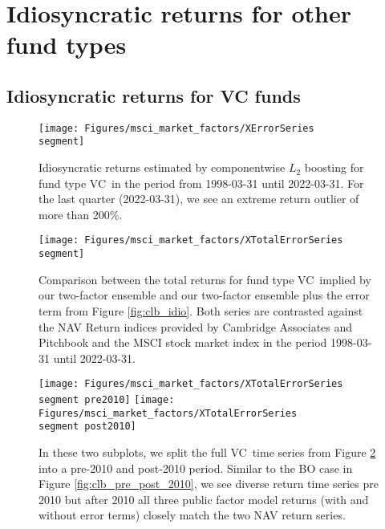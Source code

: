 \clearpage


\newcommand{\segment}{XXX}


\section{Idiosyncratic returns for other fund types}
\label{sec:error_terms_other_fund_types}

\subsection{Idiosyncratic returns for VC funds}
\label{sec:vc_errors}


\renewcommand{\segment}{VC}

\begin{figure}[H]
	\centering
	\texttt{[image: Figures/msci\_market\_factors/XErrorSeries\\segment]}
	\caption{
		Idiosyncratic returns estimated by componentwise $L_2$ boosting for fund type \segment \ in the period from 1998-03-31 until 2022-03-31.
		For the last quarter (2022-03-31), we see an extreme return outlier of more than 200\%.
	}
	\label{fig:clb_idio_\segment}
\end{figure}

\begin{figure}[H]
	\centering
	\texttt{[image: Figures/msci\_market\_factors/XTotalErrorSeries\\segment]}
	\caption{
		Comparison between the total returns for fund type \segment \ implied by our two-factor ensemble and our two-factor ensemble plus the error term from Figure \ref{fig:clb_idio}.
		Both series are contrasted against the NAV Return indices provided by Cambridge Associates and Pitchbook and the MSCI stock market index in the period 1998-03-31 until 2022-03-31.
	}
	\label{fig:clb_total_\segment}
\end{figure}

\begin{figure}[H]
	\centering
	\texttt{[image: Figures/msci\_market\_factors/XTotalErrorSeries\\segment pre2010]}
	\texttt{[image: Figures/msci\_market\_factors/XTotalErrorSeries\\segment post2010]}
	\caption{
		In these two subplots, we split the full \segment \ time series from Figure \ref{fig:clb_total_\segment} into a pre-2010 and post-2010 period.
		Similar to the BO case in Figure \ref{fig:clb_pre_post_2010}, we see diverse return time series pre 2010 but after 2010 all three public factor model returns (with and without error terms) closely match the two NAV return series.
	}
	\label{fig:clb_pre_post_2010_\segment}
\end{figure}


